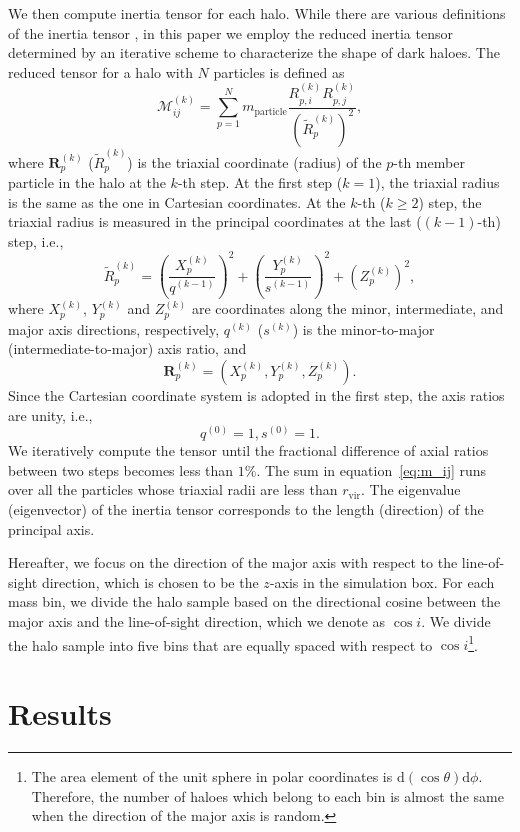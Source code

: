 \documentclass[a4paper,fleqn,usenatbib]{mnras}
\newcommand{\beq}{\begin{equation}}
\newcommand{\eeq}{\end{equation}}
\newcommand{\vir}{\mathrm{vir}}
\begin{document}
We then compute inertia tensor for each halo. While there are various
definitions of the inertia tensor \citep[][and references therein]{Bett2012},
in this paper we employ the reduced inertia tensor determined by an iterative scheme
to characterize the shape of dark haloes.
The reduced tensor for a halo with $N$ particles is defined as
\beq
\mathcal{M}_{ij}^{(k)} = \sum_{p=1}^N m_\mathrm{particle}
\frac{R^{(k)}_{p,i} R^{(k)}_{p,j}}{\left( \tilde{R}^{(k)}_p \right)^2},
\label{eq:m_ij}
\eeq
where $\bm{R}^{(k)}_p$ ($\tilde{R}^{(k)}_p$) is
the triaxial coordinate (radius) of the $p$-th member particle
in the halo at the $k$-th step. At the first step ($k = 1$), the triaxial
radius is the same as the one in Cartesian coordinates. At the $k$-th
($k \geq 2$) step, the triaxial radius is measured in the principal
coordinates at the last ($(k-1)$-th) step, i.e.,
\beq
\tilde{R}^{(k)}_p = \left( \frac{X^{(k)}_p}{q^{(k-1)}} \right)^2+
\left( \frac{Y^{(k)}_p}{s^{(k-1)}} \right)^2 + \left( Z^{(k)}_p \right)^2 ,
\eeq
where $X^{(k)}_p$, $Y^{(k)}_p$ and $Z^{(k)}_p$ are coordinates along the minor,
intermediate, and major axis directions, respectively,
$q^{(k)}$ ($s^{(k)}$) is the minor-to-major (intermediate-to-major) axis ratio, and
\beq
\bm{R}^{(k)}_p = \left( X^{(k)}_p, Y^{(k)}_p, Z^{(k)}_p \right) .
\eeq
Since the Cartesian coordinate system is adopted in the first step,
the axis ratios are unity, i.e.,
\beq
q^{(0)} = 1, s^{(0)} = 1 .
\eeq
We iteratively compute the tensor until the fractional difference of
axial ratios between two steps becomes less than $1\%$.
The sum in equation~\eqref{eq:m_ij} runs over all the
particles whose triaxial radii are less than
$r_\vir$. The eigenvalue (eigenvector) of the inertia tensor corresponds to
the length (direction) of the principal axis.

Hereafter, we focus on the direction of the major axis with respect to
the line-of-sight direction, which is chosen to be the
$z$-axis in the simulation box. For each mass bin, we divide the halo
sample based on the directional cosine between the major axis and the
line-of-sight direction, which we denote as $\cos i$.
We divide the halo sample into five bins that are equally spaced with
respect to $\cos i$\footnote{The area element of the unit sphere in
polar coordinates is $\mathrm{d} (\cos \theta) \mathrm{d} \phi$.
Therefore, the number of haloes which belong to each bin is almost
the same when the direction of the major axis is random.}.

\section{Results}
\label{sec:results}
\end{document}
